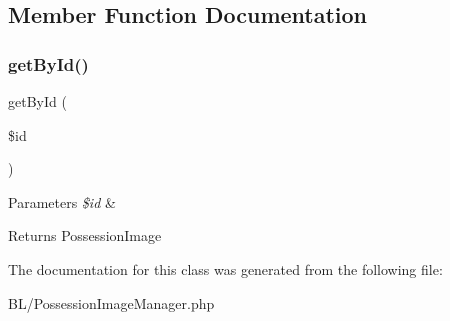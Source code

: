 \subsection{Member Function Documentation}
\mbox{\label{class_app_1_1_b_l_1_1_possession_image_manager_a04a2ab5bf1980cc1c81cd541b6bb1ee7}} 
\subsubsection{\texorpdfstring{getById()}{getById()}}
{\footnotesize\ttfamily get\+By\+Id (\begin{DoxyParamCaption}\item[{}]{\$id }\end{DoxyParamCaption})}


\begin{DoxyParams}{Parameters}
{\em \$id} & \\
\hline
\end{DoxyParams}
\begin{DoxyReturn}{Returns}
Possession\+Image 
\end{DoxyReturn}


The documentation for this class was generated from the following file\+:\begin{DoxyCompactItemize}
\item 
B\+L/Possession\+Image\+Manager.\+php\end{DoxyCompactItemize}
